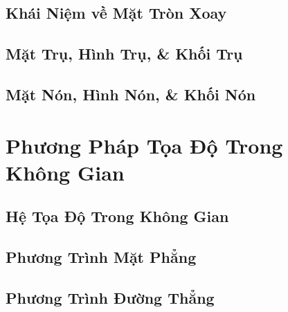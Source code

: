 \documentclass[oneside]{book}
\numberwithin{equation}{section}
\begin{document}
\section{Khái Niệm về Mặt Tròn Xoay}


\section{Mặt Trụ, Hình Trụ, \& Khối Trụ}


\section{Mặt Nón, Hình Nón, \& Khối Nón}


\chapter{Phương Pháp Tọa Độ Trong Không Gian}

\section{Hệ Tọa Độ Trong Không Gian}


\section{Phương Trình Mặt Phẳng}


\section{Phương Trình Đường Thẳng}


\printbibliography[heading=bibintoc]
	
\end{document}
